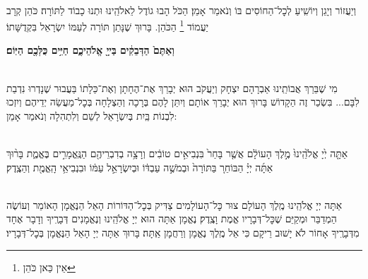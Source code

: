 \avharachamim

\\
וְיַעֲזוֹר וְיָגֵן וְיוֹשִֽׁיעַ לְכׇל־הַחוֹסִים בּוֹ וְנֹאמַר אָמֵן׃
הַכֹּל הָבוּ גוֹדֶל לֵאלֹהֵֽינוּ וּתְנוּ כָבוֹד לַתּוֹרָה׃ כֹּהֵן קְרָב יַעֲמוֹד
\footnote{ אֵין כַּאן כֹּהֵן}
הַכֹּהֵן. בָּרוּךְ שֶׁנָּתַן תּוֹרָה לְעַמּוֹ יִשְׂרָאֵל בִּקְדֻשָּׁתוֹ׃

\textbf{וְאַתֶּם֙ הַדְּבֵקִ֔ים בַּייָ֖ אֱלֹהֵיכֶ֑ם חַיִּ֥ים כֻּלְּכֶ֖ם הַיּֽוֹם׃} 

\torahbarachu

\hagomel




\begin{sometimes}

\misheberakhbaby

\misheberakhbarmitzva

\\
מִי שֶׁבֵּרַךְ אֲבוֹתֵֽינוּ אַבְרָהָם יִצְחָק וְיַעֲקֹב הוּא יְבָרֵךְ אֶת־הֶחָתָן  וְאֶת־כַּלָתוֹ  בַּעֲבוּר שֶׁנָדְרוּ נִדְבַת לִבָּם... בִּשְׂכַר זֶה הַקָדוֹשׁ בָּרוּךְ הוּא יְבָרֵךְ אוֹתָם וְיִתֵּן לָהֶם בְּרָכָה וְהַצְלָחָה בְּכׇל־מַעֲשֵׂה יְדֵיהֶם וְיִזְכוּ לִבְנוֹת בַּֽיִת בְּיִשְׂרָאֵל לְשֵׁם וְלִתְהִלָה וְנֹאמַר אָמֵן:



\end{sometimes}

\halfkaddish

\hagbaha
\newpage
{}

\\
אַתָּ֤ה יְ֙יָ אֱלֹ֙הֵֽינוּ֙ מֶ֣לֶךְ הָעוֹלָ֔ם אֲשֶׁ֤ר בָּחַר֙ בִּנְבִיאִ֣ים טוֹבִ֔ים וְרָצָ֥ה בְדִבְרֵיהֶ֖ם הַנֶּֽאֱמָרִ֣ים בֶּאֱמֶ֑ת בָּר֨וּךְ אַתָּ֜ה יְיָ֗ הַבּוֹחֵר֚ בַּתּוֹרָה֙ וּבְמֹשֶׁ֣ה עַבְדּ֔וֹ וּבְיִשְׂרָאֵ֣ל עַמּ֔וֹ וּבִנְבִיאֵ֥י הָֽאֱמֶ֖ת וְהַצֶֽדֶק׃

\\
אַתָּה יְיָ אֱלֹהֵֽינוּ מֶֽלֶךְ הָעוֹלָם צוּר כׇּל־הָעוֹלָמִים צַדִּיק בְּכׇל־הַדּוֹרוֹת הָאֵל הַנֶּאֱמָן הָאוֹמֵר וְעוֹשֶׂה הַמְדַבֵּר וּמְקַיֵּם שֶׁכׇּל־דְּבָרָיו אֱמֶת וָצֶֽדֶק׃ נֶאֱמָן אַתָּה הוּא יְיָ אֱלֹהֵֽינוּ וְנֶאֱמָנִים דְּבָרֶֽיךָ וְדָבָר אֶחָד מִדְּבָרֶֽיךָ אָחוֹר לֹא יָשׁוּב רֵיקָם כִּי אֵל מֶֽלֶךְ נֶאֱמָן וְרַחֲמָן אַֽתָּה׃ בָּרוּךְ אַתָּה יְיָ הָאֵל הַנֶּאֱמָן בְּכׇל־דְּבָרָיו׃

